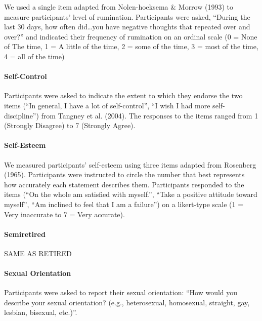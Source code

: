 \documentclass[
  letterpaper,
  DIV=11,
  numbers=noendperiod]{scrartcl}
\let\oldparagraph\paragraph
\renewcommand{\paragraph}[1]{\oldparagraph{#1}\mbox{}}
\begin{document}
We used a single item adapted from Nolen-hoeksema \& Morrow (1993) to
measure participants' level of rumination. Participants were asked,
``During the last 30 days, how often did\ldots you have negative
thoughts that repeated over and over?'' and indicated their frequency of
rumination on an ordinal scale (0 = None of The time, 1 = A little of
the time, 2 = some of the time, 3 = most of the time, 4 = all of the
time)

\hypertarget{self-control}{%
\paragraph{Self-Control}\label{self-control}}

Participants were asked to indicate the extent to which they endorse the
two items (``In general, I have a lot of self-control'', ``I wish I had
more self-discipline'') from Tangney et al. (2004). The responses to the
items ranged from 1 (Strongly Disagree) to 7 (Strongly Agree).

\hypertarget{self-esteem}{%
\paragraph{Self-Esteem}\label{self-esteem}}

We measured participants' self-esteem using three items adapted from
Rosenberg (1965). Participants were instructed to circle the number that
best represents how accurately each statement describes them.
Participants responded to the items (``On the whole am satisfied with
myself.'', ``Take a positive attitude toward myself'', ``Am inclined to
feel that I am a failure'') on a likert-type scale (1 = Very inaccurate
to 7 = Very accurate).

\hypertarget{semiretired}{%
\paragraph{Semiretired}\label{semiretired}}

SAME AS RETIRED

\hypertarget{sexual-orientation}{%
\paragraph{Sexual Orientation}\label{sexual-orientation}}

Participants were asked to report their sexual orientation: ``How would
you describe your sexual orientation? (e.g., heterosexual, homosexual,
straight, gay, lesbian, bisexual, etc.)''.
\end{document}
